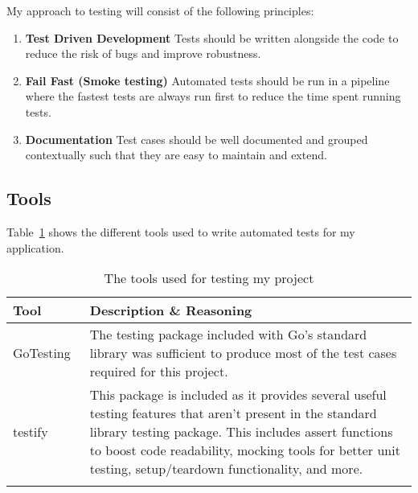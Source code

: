
My approach to testing will consist of the following principles:

\begin{enumerate}
  \item \textbf{Test Driven Development} Tests should be written alongside the code to reduce the risk of bugs and improve robustness.
  \item \textbf{Fail Fast (Smoke testing)} Automated tests should be run in a pipeline where the fastest tests are always run first to reduce the time spent running tests.
  \item \textbf{Documentation} Test cases should be well documented and grouped contextually such that they are easy to maintain and extend.
\end{enumerate}

\subsection*{Tools}

Table~\ref{tab:tools-testing} shows the different tools used to write automated tests for my application.

\begin{longtable}{p{} p{}}
  \toprule
  \textbf{Tool} & \textbf{Description \& Reasoning}
  \\\midrule\midrule
  Go\newline Testing~\cite{noauthor_testing_nodate-1}
  & The testing package included with Go's standard library was sufficient to produce most of the test cases required for this project.
  \\
  testify~\cite{noauthor_testify_2023}
  & This package is included as it provides several useful testing features that aren't present in the standard library testing package. This includes assert functions to boost code readability, mocking tools for better unit testing, setup/teardown functionality, and more.
  \\\bottomrule\bottomrule
  \caption{The tools used for testing my project}
  \label{tab:tools-testing}
\end{longtable}
